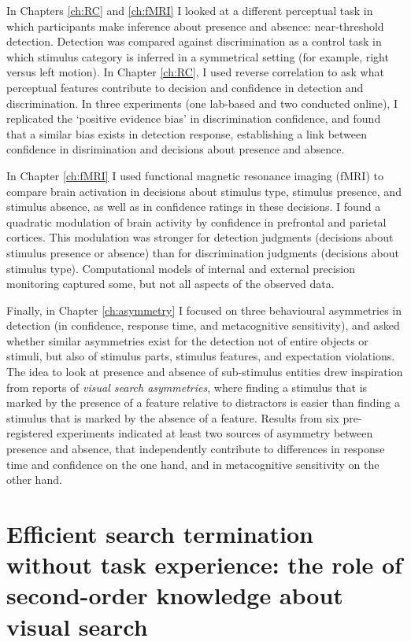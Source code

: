 \documentclass[12pt,twoside]{reedthesis}
\begin{document}
In Chapters \ref{ch:RC} and \ref{ch:fMRI} I looked at a different perceptual task in which participants make inference about presence and absence: near-threshold detection. Detection was compared against discrimination as a control task in which stimulus category is inferred in a symmetrical setting (for example, right versus left motion). In Chapter \ref{ch:RC}, I used reverse correlation to ask what perceptual features contribute to decision and confidence in detection and discrimination. In three experiments (one lab-based and two conducted online), I replicated the `positive evidence bias' in discrimination confidence, and found that a similar bias exists in detection response, establishing a link between confidence in disrimination and decisions about presence and absence.

In Chapter \ref{ch:fMRI} I used functional magnetic resonance imaging (fMRI) to compare brain activation in decisions about stimulus type, stimulus presence, and stimulus absence, as well as in confidence ratings in these decisions. I found a quadratic modulation of brain activity by confidence in prefrontal and parietal cortices. This modulation was stronger for detection judgments (decisions about stimulus presence or absence) than for discrimination judgments (decisions about stimulus type). Computational models of internal and external precision monitoring captured some, but not all aspects of the observed data.

Finally, in Chapter \ref{ch:asymmetry} I focused on three behavioural asymmetries in detection (in confidence, response time, and metacognitive sensitivity), and asked whether similar asymmetries exist for the detection not of entire objects or stimuli, but also of stimulus parts, stimulus features, and expectation violations. The idea to look at presence and absence of sub-stimulus entities drew inspiration from reports of \emph{visual search asymmetries}, where finding a stimulus that is marked by the presence of a feature relative to distractors is easier than finding a stimulus that is marked by the absence of a feature. Results from six pre-registered experiments indicated at least two sources of asymmetry between presence and absence, that independently contribute to differences in response time and confidence on the one hand, and in metacognitive sensitivity on the other hand.

\hypertarget{ch:termination}{%
\chapter{Efficient search termination without task experience: the role of second-order knowledge about visual search}\label{ch:termination}}
\end{document}
